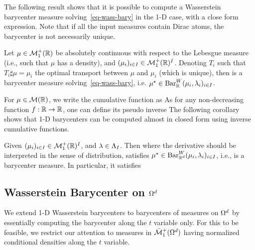 The following result shows that it is possible to compute a Wasserstein barycenter measure solving~\eqref{eq-wass-bary} in the 1-D case, with a close form expression. Note that if all the input measures contain Dirac atoms, the barycenter is not necessarily unique. 


\begin{prop}\label{prop-bary-1d-pushfwd}
	Let $\mu \in \mathcal{M}_1^+(\mathbb{R})$ be absolutely continuous with respect to the Lebesgue measure (i.e., such that $\mu$ has a density), and $(\mu_i)_{i \in I} \in \mathcal{M}_1^+(\mathbb{R})^I$. Denoting $T_i$ such that $T_i \sharp \mu = \mu_i$ the optimal transport between $\mu$ and $\mu_i$ (which is unique), then 
	is a barycenter measure solving~\eqref{eq-wass-bary}, i.e. $\mu^\star \in \text{\upshape Bar}_{\mathbb{R}}^W(\mu_i,\lambda_i)_{i \in I}$.
\end{prop}


For $\mu \in \mathcal{M}(\mathbb{R})$, we write the cumulative function as 
\eql{\label{eq-cumulative-defn}
	\foralls t \in \RR, \quad
	C_\mu(t) = \mu(]-\infty,t]).
}
As for any non-decreasing function $f : \mathbb{R} \rightarrow \mathbb{R}$, one can define its pseudo inverse 
The following corollary shows that 1-D barycenters can be computed almost in closed form using inverse cumulative functions.


\begin{cor}\label{prop-bary-1d}
Given $(\mu_i)_{i \in I} \in \mathcal{M}_1^+(\mathbb{R})^I$, and $\lambda \in \Lambda_I$. Then 
where the derivative should be interpreted in the sense of distribution, satisfies 
$\mu^\star \in \text{\upshape Bar}_{\mathbb{R}^d}^W(\mu_i,\lambda_i)_{i \in I}$, i.e., is a barycenter measure.
In particular, it satisfies
\end{cor}



\subsection{Wasserstein Barycenter on $\Omega^d$}

We extend 1-D Wasserstein barycenters to barycenters of measures on $\Omega^d$ by essentially computing the barycenter along the $t$ variable only. For this to be feasible, we restrict our attention to measures in $\bar{\mathcal{M}}_1^+(\Omega^d)$ having normalized conditional densities along the $t$ variable. 


